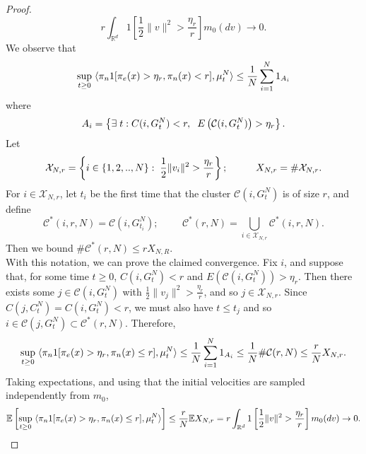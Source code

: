 \begin{proof}
\begin{equation}
    r\int_{\mathbb{R}^d}1\left[\frac{1}{2}\|v\|^2>\frac{\eta_r}{r}\right]m_0(dv)\rightarrow 0.
\end{equation}We observe that \begin{equation}
    \sup_{t\geq 0} \hspace{0.1cm} \langle \pi_n 1[\pi_e(x)>\eta_r, \pi_n(x)< r], \mu^N_t\rangle \leq \frac{1}{N}\sum_{i=1}^N 1_{A_i}  
\end{equation} where \begin{equation}
    A_i=\left\{\exists \hspace{0.1cm} t: C(i, G^N_t)< r, \hspace{0.2cm} E\left(\mathcal{C}(i, G^N_t)\right)> \eta_r \right\}.
\end{equation} Let \begin{equation}
    \mathcal{X}_{N,r}=\left\{i \in \{1,2,..,N\}: \hspace{0.1cm} \frac{1}{2}\|v_i\|^2>\frac{\eta_r}{r}\right\}; \hspace{1cm}X_{N,r}=\#\mathcal{X}_{N,r}.
\end{equation} For $i\in \mathcal{X}_{N,r}$, let $t_{i}$ be the first time that the cluster $\mathcal{C}(i, G^N_t)$ is of size $r$, and define \begin{equation}
    \mathcal{C}^*(i,r,N)=\mathcal{C}(i, G^N_{t_i});\hspace{1cm} \mathcal{C}^*(r,N)=\bigcup_{i\in \mathcal{X}_{N,r}} \mathcal{C}^*(i,r,N).
\end{equation} Then we bound $\#\mathcal{C}^*(r,N)\le r X_{N,R}$.  \medskip \\ With this notation, we can prove the claimed convergence. Fix $i$, and suppose that, for some time $t\geq 0$, $C(i, G^N_t)< r$ and $E(\mathcal{C}(i, G^N_t))> \eta_r.$ Then there exists some $j \in \mathcal{C}(i, G^N_t)$ with $\frac{1}{2}\|v_j\|^2 >\frac{\eta_r}{r}$, and so $j\in \mathcal{X}_{N,r}$. Since $C(j, C^N_t)=C(i, G^N_t)< r$, we must also have $t\le t_j$ and so $i\in\mathcal{C}(j,G^N_t) \subset \mathcal{C}^*(r,N).$ Therefore, \begin{equation}
    \sup_{t\geq 0} \hspace{0.1cm} \langle \pi_n 1[\pi_e(x)>\eta_r, \pi_n(x)\le r], \mu^N_t\rangle \le \frac{1}{N}\sum_{i=1}^N 1_{A_i} \le \frac{1}{N}\#\mathcal{C}(r,N) \le \frac{r}{N}X_{N,r}.
\end{equation} Taking expectations, and using that the initial velocities are sampled independently from $m_0$, \begin{equation} \begin{split}
    \mathbb{E}\left[\sup_{t\geq 0} \hspace{0.1cm} \langle \pi_n 1[\pi_e(x)>\eta_r, \pi_n(x)\le r], \mu^N_t\rangle\right] \le \frac{r}{N} \mathbb{E} X_{N,r}  = r\int_{\mathbb{R}^d} 1\left[\frac{1}{2}\|v\|^2>\frac{\eta_r}{r}\right]m_0(dv) \rightarrow 0. 
\end{split} \end{equation}\end{proof}  
